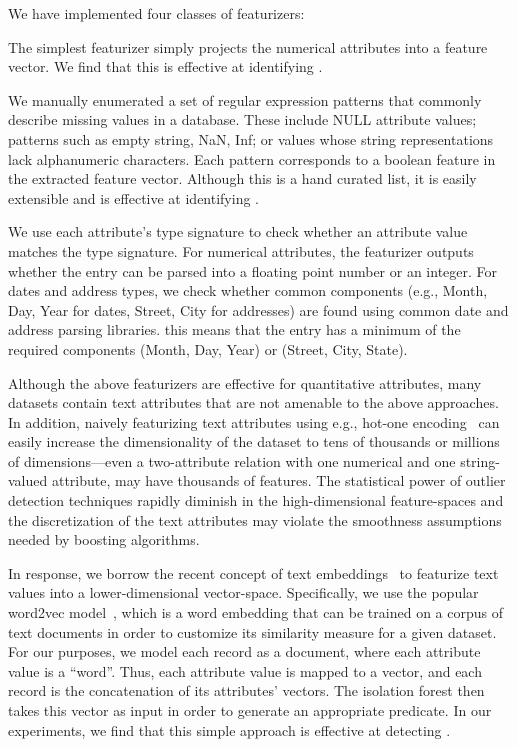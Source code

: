 We have implemented four classes of featurizers:


 The simplest featurizer simply projects the numerical attributes into a feature vector.  We find that this is effective at identifying .

  We manually enumerated a set of regular expression patterns that commonly describe missing values in a database.  These include \textsf{NULL} attribute values; patterns such as empty string, NaN, Inf; or values whose string representations lack alphanumeric characters. Each pattern corresponds to a boolean feature in the extracted feature vector.   Although this is a hand curated list, it is easily extensible and is effective at identifying .

 We use each attribute's type signature to check whether an attribute value matches the type signature.  For numerical attributes, the featurizer outputs whether the entry can be parsed into a floating point number or an integer. For dates and address types, we check whether common components (e.g., Month, Day, Year for dates, Street, City for addresses) are found using common date and address parsing libraries.   this means that the entry has a minimum of the required components (Month, Day, Year) or (Street, City, State). 


Although the above featurizers are effective for quantitative attributes, many datasets contain text attributes that are not amenable to the above approaches.  In addition, naively featurizing text attributes using e.g., hot-one encoding~\cite{} can easily increase the dimensionality of the dataset to tens of thousands or millions of dimensions---even a two-attribute relation with one numerical and one string-valued attribute, may have thousands of features.  The statistical power of outlier detection techniques rapidly diminish in the high-dimensional feature-spaces and the discretization of the text attributes may violate the smoothness assumptions needed by boosting algorithms.

In response, we borrow the recent concept of text embeddings~\cite{} to featurize text values into a lower-dimensional vector-space.  Specifically, we use the popular \textsf{word2vec} model~\cite{mikolov2013distributed}, which is a word embedding that can be trained on a corpus of text documents in order to customize its similarity measure for a given dataset.  For our purposes, we model each record as a document, where each attribute value is a ``word''.  Thus, each attribute value is mapped to a vector, and each record is the concatenation of its attributes' vectors.  The isolation forest then takes this vector as input in order to generate an appropriate predicate.  In our experiments, we find that this simple approach is effective at detecting  .


